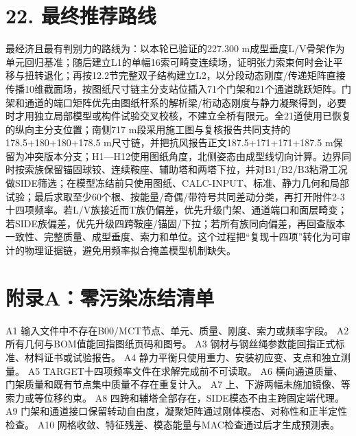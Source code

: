 \documentclass[UTF8,a4paper,11pt,fontset=none]{ctexart}
\begin{document}
\section*{22. 最终推荐路线}
最经济且最有判别力的路线为：以本轮已验证的227.300 m成型垂度L/V骨架作为单元回归基准；随后建立L1的单幅16索可畸变连续场，证明张力索束何时会让平移与扭转退化；再按12.2节完整双子结构建立L2，以分段动态刚度/传递矩阵直接传播10维截面场，按图纸尺寸链主分支站位插入71个门架和21个通道跳跃矩阵。门架和通道的端口矩阵优先由图纸杆系的解析梁/桁动态刚度与静力凝聚得到，必要时才用独立局部模型或构件试验交叉校核，不建立全桥有限元。全21道使用已恢复的纵向主分支位置；南侧717 m段采用施工图与复核报告共同支持的178.5+180+180+178.5 m尺寸链，并把抗风报告正文187.5+171+171+187.5 m保留为冲突版本分支；H1—H12使用图纸角度，北侧姿态由成型线切向计算。边界同时按索族保留锚固球铰、连续鞍座、辅助塔和两塔下拉，并对B1/B2/B3粘滑工况做SIDE筛选；在模型冻结前只使用图纸、CALC-INPUT、标准、静力几何和局部试验；最后求取至少60个根、按能量/奇偶/带符号共同差动分类，再打开附件2-3十四项频率。若L/V族接近而T族仍偏差，优先升级门架、通道端口和面层畸变；若SIDE族偏差，优先升级四跨鞍座/锚固/下拉；若所有族同向偏差，再回查版本一致性、完整质量、成型垂度、索力和单位。这个过程把“复现十四项”转化为可审计的物理证据链，避免用频率拟合掩盖模型机制缺失。\par
{}
\section*{附录A：零污染冻结清单}
A1 输入文件中不存在B00/MCT节点、单元、质量、刚度、索力或频率字段。 A2 所有几何与BOM值能回指图纸页码和图号。 A3 钢材与钢丝绳参数能回指正式标准、材料证书或试验报告。 A4 静力平衡只使用重力、安装初应变、支点和独立测量。 A5 TARGET十四项频率文件在求解完成前不可读取。 A6 横向通道质量、门架质量和既有节点集中质量不存在重复计入。 A7 上、下游两幅未施加镜像、等索力或等位移约束。 A8 四跨和辅塔全部存在，SIDE模态不由主跨固定端代理。 A9 门架和通道接口保留转动自由度，凝聚矩阵通过刚体模态、对称性和正半定性检查。 A10 网格收敛、特征残差、模态能量与MAC检查通过后才生成预测表。\par
{}
\end{document}
